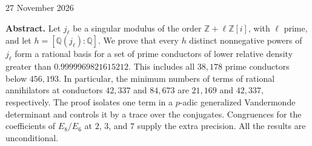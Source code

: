 \documentclass[11pt]{article}
\newcommand{\Q}{\mathbb Q}
\newcommand{\Z}{\mathbb Z}
\begin{document}
\thispagestyle{plain}
\hfill{\small 27 November 2026}
\par\vspace{12pt}
\par\vspace{4pt}
\par\vspace{14pt}
\noindent\textbf{Abstract.}
Let $j_\ell$ be a singular modulus of the order $\Z+\ell\Z[i]$, with $\ell$ prime, and let $h=[\Q(j_\ell):\Q]$.
We prove that every $h$ distinct nonnegative powers of $j_\ell$ form a rational basis for a set of prime conductors of lower relative density greater than $0.9999969821615212$.
This includes all $38{,}178$ prime conductors below $456{,}193$.
In particular, the minimum numbers of terms of rational annihilators at conductors $42{,}337$ and $84{,}673$ are $21{,}169$ and $42{,}337$, respectively.
The proof isolates one term in a $p$-adic generalized Vandermonde determinant and controls it by a trace over the conjugates.
Congruences for the coefficients of $E_8/E_6$ at $2$, $3$, and $7$ supply the extra precision. All the results are unconditional.
\end{document}
